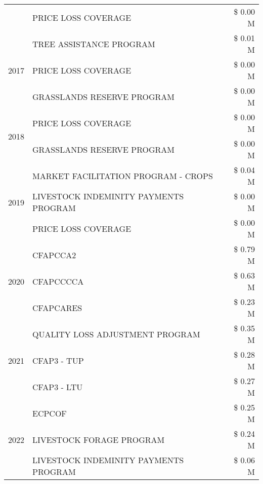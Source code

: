 \begin{tabular}{llr}
 & PRICE LOSS COVERAGE & \$ 0.00 M \\
\cline{1-3}
\multirow[t]{3}{*}{2017} & TREE ASSISTANCE PROGRAM & \$ 0.01 M \\
 & PRICE LOSS COVERAGE & \$ 0.00 M \\
 & GRASSLANDS RESERVE PROGRAM & \$ 0.00 M \\
\cline{1-3}
\multirow[t]{2}{*}{2018} & PRICE LOSS COVERAGE & \$ 0.00 M \\
 & GRASSLANDS RESERVE PROGRAM & \$ 0.00 M \\
\cline{1-3}
\multirow[t]{3}{*}{2019} & MARKET FACILITATION PROGRAM - CROPS & \$ 0.04 M \\
 & LIVESTOCK INDEMINITY PAYMENTS PROGRAM & \$ 0.00 M \\
 & PRICE LOSS COVERAGE & \$ 0.00 M \\
\cline{1-3}
\multirow[t]{3}{*}{2020} & CFAPCCA2 & \$ 0.79 M \\
 & CFAPCCCCA & \$ 0.63 M \\
 & CFAPCARES & \$ 0.23 M \\
\cline{1-3}
\multirow[t]{3}{*}{2021} & QUALITY LOSS ADJUSTMENT PROGRAM & \$ 0.35 M \\
 & CFAP3 - TUP & \$ 0.28 M \\
 & CFAP3 - LTU & \$ 0.27 M \\
\cline{1-3}
\multirow[t]{3}{*}{2022} & ECPCOF & \$ 0.25 M \\
 & LIVESTOCK FORAGE PROGRAM & \$ 0.24 M \\
 & LIVESTOCK INDEMINITY PAYMENTS PROGRAM & \$ 0.06 M \\
\cline{1-3}
\bottomrule
\end{tabular}

